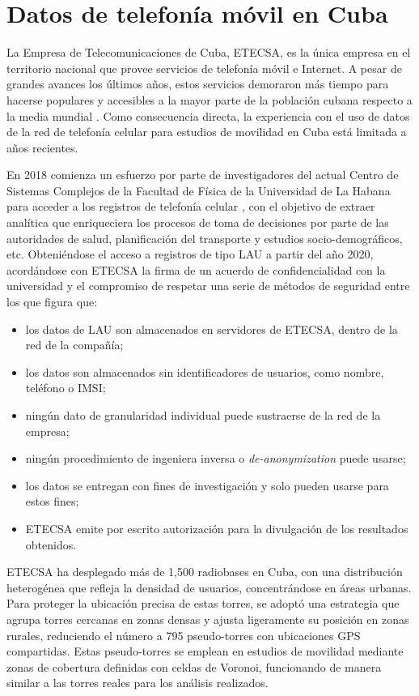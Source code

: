 \section{Datos de telefonía móvil en Cuba}

La Empresa de Telecomunicaciones de Cuba, ETECSA, es la única empresa en el territorio nacional que provee servicios de telefonía móvil e Internet. A pesar de grandes avances los últimos años, estos servicios demoraron más tiempo para hacerse populares y accesibles a la mayor parte de la población cubana respecto a la media mundial \cite{durive2021sistema}. Como consecuencia directa, la experiencia con el uso de datos de la red de telefonía celular para estudios de movilidad en Cuba está limitada a años recientes.

En 2018 comienza un esfuerzo por parte de investigadores del actual Centro de Sistemas Complejos de la Facultad de Física de la Universidad de La Habana para acceder a los registros de telefonía celular \cite{durive2021sistema}, con el objetivo de extraer analítica que enriqueciera los procesos de toma de decisiones por parte de las autoridades de salud, planificación del transporte y estudios socio-demográficos, etc. Obteniéndose el acceso a registros de tipo LAU a partir del año 2020, acordándose con ETECSA la firma de un acuerdo de confidencialidad con la universidad y el compromiso de respetar una serie de métodos de seguridad entre los que figura que:

\begin{itemize}
    \item los datos de LAU son almacenados en servidores de ETECSA, dentro de la red de la compañía;
    \item los datos son almacenados sin identificadores de usuarios, como nombre, teléfono o IMSI;
    \item ningún dato de granularidad individual puede sustraerse de la red de la empresa;
    \item ningún procedimiento de ingeniera inversa o \textit{de-anonymization} puede usarse;
    \item los datos se entregan con fines de investigación y solo pueden usarse para estos fines;
    \item ETECSA emite por escrito autorización para la divulgación de los resultados obtenidos.
\end{itemize}

ETECSA ha desplegado más de 1,500 radiobases en Cuba, con una distribución heterogénea que refleja la densidad de usuarios, concentrándose en áreas urbanas. Para proteger la ubicación precisa de estas torres, se adoptó una estrategia que agrupa torres cercanas en zonas densas y ajusta ligeramente su posición en zonas rurales, reduciendo el número a 795 pseudo-torres con ubicaciones GPS compartidas. Estas pseudo-torres se emplean en estudios de movilidad mediante zonas de cobertura definidas con celdas de Voronoi, funcionando de manera similar a las torres reales para los análisis realizados.

